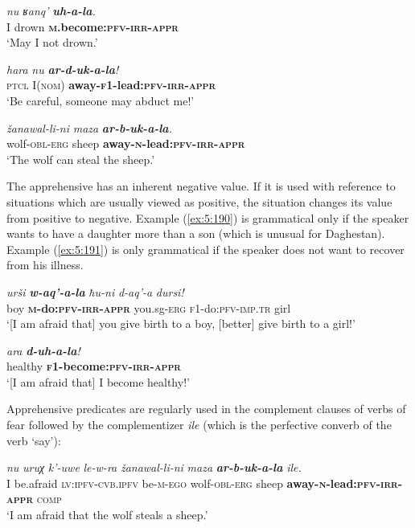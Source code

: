﻿\documentclass[output=paper]{langsci/langscibook}
\begin{document}
\ea %
\gll \emph{nu} \emph{ʁanq'}  \emph{\textbf{uh-a-la}.}\\
 I drown \textbf{\textsc{m}.become:\textsc{pfv}-\textsc{irr}-\textsc{appr}}\\
\glt `May I not drown.'

\ex %
\gll \emph{hara} \emph{nu} \emph{\textbf{ar-d-uk-a-la}!}\\
 \textsc{ptcl} I(\textsc{nom}) \textbf{away-\textsc{f1}-lead:\textsc{pfv}-\textsc{irr}-\textsc{appr}}\\
\glt `Be careful, someone may abduct me!'

\ex %
\gll \emph{žanawal-li-ni} \emph{maza} \emph{\textbf{ar-b-uk-a-la}.}\\
 wolf-\textsc{obl}-\textsc{erg} sheep \textbf{away-\textsc{n}-lead:\textsc{pfv}-\textsc{irr}-\textsc{appr}}\\
\glt `The wolf can steal the sheep.'
\z

The apprehensive has an inherent negative value. If it is used with
reference to situations which are usually viewed as positive, the
situation changes its value from positive to negative. Example (\ref{ex:5:190})
is grammatical only if the speaker wants to have a daughter more than a
son (which is unusual for Daghestan). Example (\ref{ex:5:191}) is only grammatical if the
speaker does not want to recover from his illness.

\ea \label{ex:5:190} %
\gll \emph{urši} \emph{\textbf{w-aq'-a-la}} \emph{ħu-ni} \emph{d-aq'-a} \emph{dursi!}\\
 boy \textbf{\textsc{m}-do:\textsc{pfv}-\textsc{irr}-\textsc{appr}} you.sg-\textsc{erg} \textsc{f1}-do:\textsc{pfv}-\textsc{imp}.\textsc{tr} girl\\
\glt `[I am afraid that] you give birth to a boy, [better] give birth to a girl!'

\ex \label{ex:5:191} %
\gll \emph{ara} \emph{\textbf{d-uh-a-la}!}\\
 healthy \textbf{\textsc{f1}-become:\textsc{pfv}-\textsc{irr}-\textsc{appr}}\\
\glt `[I am afraid that] I become healthy!'
\z

Apprehensive predicates are regularly used in the complement clauses of
verbs of fear followed by the complementizer \emph{ile} (which is
the perfective converb of the verb `say'):

\ea %
\gll \emph{nu} \emph{uruχ} \emph{k'-uwe} \emph{le-w-ra} \emph{žanawal-li-ni}  \emph{maza} \emph{\textbf{ar-b-uk-a-la}} \emph{ile.}\\
 I be.afraid \textsc{lv}:\textsc{ipfv}-\textsc{cvb.ipfv} be-\textsc{m}-\textsc{ego} wolf-\textsc{obl}-\textsc{erg}  sheep \textbf{away-\textsc{n}-lead:\textsc{pfv}-\textsc{irr}-\textsc{appr}} \textsc{comp} \\
\glt `I am afraid that the wolf steals a sheep.'
\end{document}

